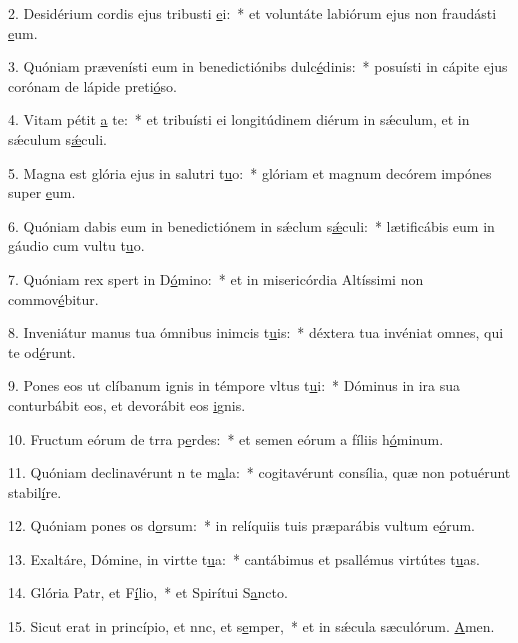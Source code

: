 2. Desidérium cordis ejus tribusti \uline{e}i:~* et voluntáte labiórum ejus non fraudásti \uline{e}um.\par 
3. Quóniam prævenísti eum in benedictiónibs dulc\uline{é}dinis:~* posuísti in cápite ejus corónam de lápide preti\uline{ó}so.\par 
4. Vitam pétit \uline{a} te:~* et tribuísti ei longitúdinem diérum in sǽculum, et in sǽculum s\uline{ǽ}culi.\par 
5. Magna est glória ejus in salutri t\uline{u}o:~* glóriam et magnum decórem impónes super \uline{e}um.\par 
6. Quóniam dabis eum in benedictiónem in sǽclum s\uline{ǽ}culi:~* lætificábis eum in gáudio cum vultu t\uline{u}o.\par 
7. Quóniam rex spert in D\uline{ó}mino:~* et in misericórdia Altíssimi non commov\uline{é}bitur.\par 
8. Inveniátur manus tua ómnibus inimcis t\uline{u}is:~* déxtera tua invéniat omnes, qui te od\uline{é}runt.\par 
9. Pones eos ut clíbanum ignis in témpore vltus t\uline{u}i:~* Dóminus in ira sua conturbábit eos, et devorábit eos \uline{i}gnis.\par 
10. Fructum eórum de trra p\uline{e}rdes:~* et semen eórum a fíliis h\uline{ó}minum.\par 
11. Quóniam declinavérunt n te m\uline{a}la:~* cogitavérunt consília, quæ non potuérunt stabil\uline{í}re.\par 
12. Quóniam pones os d\uline{o}rsum:~* in relíquiis tuis præparábis vultum e\uline{ó}rum.\par 
13. Exaltáre, Dómine, in virtte t\uline{u}a:~* cantábimus et psallémus virtútes t\uline{u}as.\par 
14. Glória Patr, et F\uline{í}lio,~* et Spirítui S\uline{a}ncto.\par 
15. Sicut erat in princípio, et nnc, et s\uline{e}mper,~* et in sǽcula sæculórum. \uline{A}men.\par 
